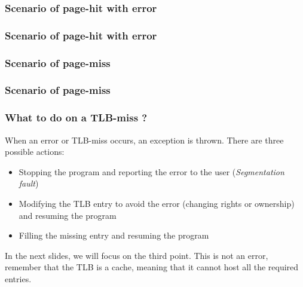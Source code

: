 \begin{frame}
  \frametitle{Scenario of page-hit with error}

  \begin{center}
  \end{center}

\end{frame}


\begin{frame}
  \frametitle{Scenario of page-hit with error}

  \begin{center}
  \end{center}

\end{frame}


\begin{frame}
  \frametitle{Scenario of page-miss}

  \begin{center}
  \end{center}

\end{frame}


\begin{frame}
  \frametitle{Scenario of page-miss}

  \begin{center}
  \end{center}

\end{frame}


\begin{frame}
  \frametitle{What to do on a TLB-miss ?}

  When an error or TLB-miss occurs, an exception is thrown. There are
  three possible actions:

  \begin{itemize}
  \item
    Stopping the program and reporting the error to the user
    (\emph{Segmentation fault})
  \item
    Modifying the TLB entry to avoid the error (changing rights or
    ownership) and resuming the program
  \item
    Filling the missing entry and resuming the program
  \end{itemize}

  \-

  In the next slides, we will focus on the third point. This is not an
  error, remember that the TLB is a cache, meaning that it cannot host
  all the required entries.

\end{frame}

